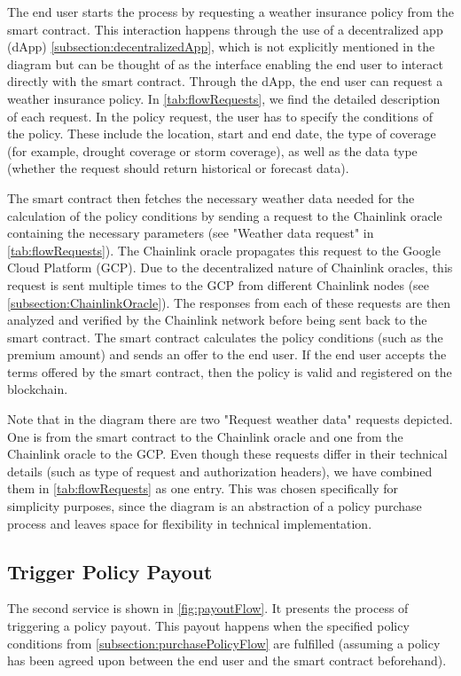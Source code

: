 The end user starts the process by requesting a weather insurance policy from the smart contract. This interaction happens through the use of a decentralized app (dApp) \cref{subsection:decentralizedApp}, which is not explicitly mentioned in the diagram but can be thought of as the interface enabling the end user to interact directly with the smart contract. Through the dApp, the end user can request a weather insurance policy. In \cref{tab:flowRequests}, we find the detailed description of each request. In the policy request, the user has to specify the conditions of the policy. These include the location, start and end date, the type of coverage (for example, drought coverage or storm coverage), as well as the data type (whether the request should return historical or forecast data).

The smart contract then fetches the necessary weather data needed for the calculation of the policy conditions by sending a request to the Chainlink oracle containing the necessary parameters (see "Weather data request" in \cref{tab:flowRequests}). The Chainlink oracle propagates this request to the Google Cloud Platform (GCP). Due to the decentralized nature of Chainlink oracles, this request is sent multiple times to the GCP from different Chainlink nodes (see \cref{subsection:ChainlinkOracle}). The responses from each of these requests are then analyzed and verified by the Chainlink network before being sent back to the smart contract. The smart contract calculates the policy conditions (such as the premium amount) and sends an offer to the end user. If the end user accepts the terms offered by the smart contract, then the policy is valid and registered on the blockchain.

Note that in the diagram there are two "Request weather data" requests depicted. One is from the smart contract to the Chainlink oracle and one from the Chainlink oracle to the GCP. Even though these requests differ in their technical details (such as type of request and authorization headers), we have combined them in \cref{tab:flowRequests} as one entry. This was chosen specifically for simplicity purposes, since the diagram is an abstraction of a policy purchase process and leaves space for flexibility in technical implementation.

\subsection{Trigger Policy Payout}\label{subsection:policyPayoutTrigger}
The second service is shown in \cref{fig:payoutFlow}. It presents the process of triggering a policy payout. This payout happens when the specified policy conditions from \cref{subsection:purchasePolicyFlow} are fulfilled (assuming a policy has been agreed upon between the end user and the smart contract beforehand).

